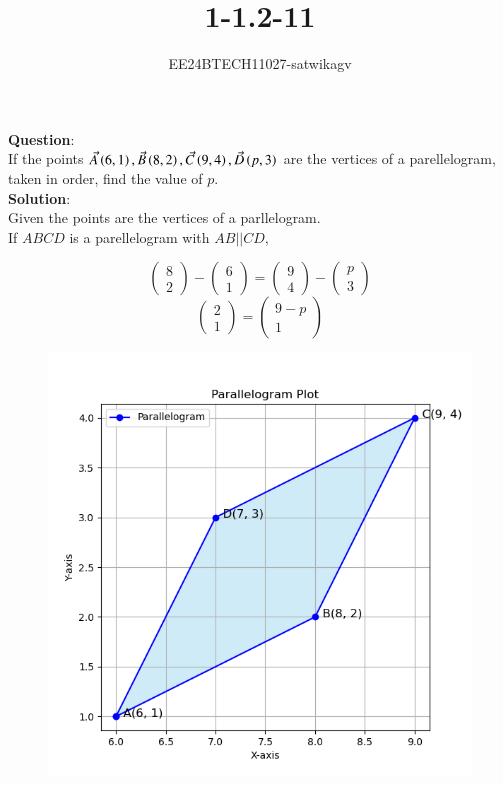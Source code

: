 \documentclass[journal]{IEEEtran}
\begin{document}

\vspace{3cm}

\title{1-1.2-11}
\author{EE24BTECH11027-satwikagv}
{\let\newpage\relax\maketitle}

\renewcommand{\thefigure}{\theenumi}
\renewcommand{\thetable}{\theenumi}
\setlength{\intextsep}{10pt} %


\renewcommand{\thetable}{\theenumi}
\textbf{Question}:\\
If the points $\Vec{A}\left(6,1\right),\Vec{B}\left(8,2\right),\Vec{C}\left(9,4\right),\Vec{D}\left(p,3\right)$ are the vertices of a parellelogram, taken in order, find the value of $p$.\\
\textbf{Solution}:\\Given the points are the vertices of a parllelogram. \\If $ABCD$ is a parellelogram with $AB||CD$,\\

\[
\begin{pmatrix}
8  \\
2 
\end{pmatrix}
-
\begin{pmatrix}
6  \\
1 
\end{pmatrix}
=
\begin{pmatrix}
9  \\
4 
\end{pmatrix}
-
\begin{pmatrix}
p  \\
3 
\end{pmatrix}
\]
\[
\begin{pmatrix}
2 \\
1
\end{pmatrix}
=
\begin{pmatrix}
9-p \\
1
\end{pmatrix}
\]

\begin{figure}[h!]
   \centering
   \includegraphics[width=0.7\linewidth]{figs/parallelogram_plot.png}
   
   
\end{figure}
\end{document}
